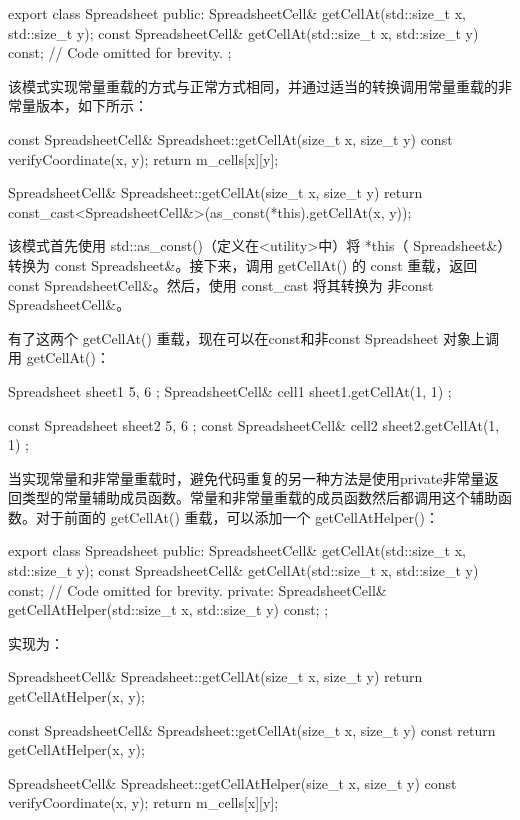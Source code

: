 \begin{cpp}
export class Spreadsheet
{
    public:
        SpreadsheetCell& getCellAt(std::size_t x, std::size_t y);
        const SpreadsheetCell& getCellAt(std::size_t x, std::size_t y) const;
        // Code omitted for brevity.
};
\end{cpp}

该模式实现常量重载的方式与正常方式相同，并通过适当的转换调用常量重载的非常量版本，如下所示：

\begin{cpp}
const SpreadsheetCell& Spreadsheet::getCellAt(size_t x, size_t y) const
{
    verifyCoordinate(x, y);
    return m_cells[x][y];
}

SpreadsheetCell& Spreadsheet::getCellAt(size_t x, size_t y)
{
    return const_cast<SpreadsheetCell&>(as_const(*this).getCellAt(x, y));
}
\end{cpp}

该模式首先使用 std::as\_const()（定义在<utility>中）将 *this（ Spreadsheet\&）转换为 const Spreadsheet\&。接下来，调用 getCellAt() 的 const 重载，返回 const SpreadsheetCell\&。然后，使用 const\_cast 将其转换为 非const SpreadsheetCell\&。

有了这两个 getCellAt() 重载，现在可以在const和非const Spreadsheet 对象上调用 getCellAt()：

\begin{cpp}
Spreadsheet sheet1 { 5, 6 };
SpreadsheetCell& cell1 { sheet1.getCellAt(1, 1) };

const Spreadsheet sheet2 { 5, 6 };
const SpreadsheetCell& cell2 { sheet2.getCellAt(1, 1) };
\end{cpp}


当实现常量和非常量重载时，避免代码重复的另一种方法是使用private非常量返回类型的常量辅助成员函数。常量和非常量重载的成员函数然后都调用这个辅助函数。对于前面的 getCellAt() 重载，可以添加一个 getCellAtHelper()：

\begin{cpp}
export class Spreadsheet
{
    public:
        SpreadsheetCell& getCellAt(std::size_t x, std::size_t y);
        const SpreadsheetCell& getCellAt(std::size_t x, std::size_t y) const;
        // Code omitted for brevity.
    private:
        SpreadsheetCell& getCellAtHelper(std::size_t x, std::size_t y) const;
};
\end{cpp}

实现为：

\begin{cpp}
SpreadsheetCell& Spreadsheet::getCellAt(size_t x, size_t y)
{
    return getCellAtHelper(x, y);
}

const SpreadsheetCell& Spreadsheet::getCellAt(size_t x, size_t y) const
{
    return getCellAtHelper(x, y);
}

SpreadsheetCell& Spreadsheet::getCellAtHelper(size_t x, size_t y) const
{
    verifyCoordinate(x, y);
    return m_cells[x][y];
}
\end{cpp}

